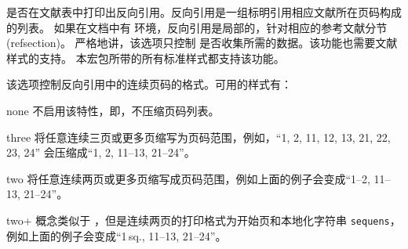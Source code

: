 \begin{optionlist}

是否在文献表中打印出反向引用。反向引用是一组标明引用相应文献所在页码构成的列表。
如果在文档中有  环境，反向引用是局部的，针对相应的参考文献分节(refsection)。
严格地讲，该选项只控制 \biblatex 是否收集所需的数据。该功能也需要文献样式的支持。
本宏包所带的所有标准样式都支持该功能。


该选项控制反向引用中的连续页码的格式。可用的样式有：

\begin{valuelist}

\item[none] %
不启用该特性，即，不压缩页码列表。

\item[three] %
将任意连续三页或更多页缩写为页码范围，例如，“1, 2, 11, 12, 13, 21, 22, 23, 24” 会压缩成“1, 2, 11--13, 21--24”。

\item[two] %
将任意连续两页或更多页缩写成页码范围，例如上面的例子会变成“1--2, 11--13, 21--24”。

\item[two+] %
概念类似于 ，但是连续两页的打印格式为开始页和本地化字符串 \texttt{sequens}，例如上面的例子会变成“1\,sq., 11--13, 21--24”。


\end{valuelist}
\end{optionlist}
